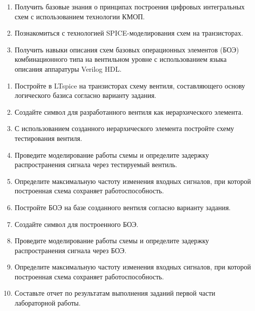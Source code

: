 


\tableofcontents


\newpage
\Chapter{\lab\ \labnumber}{\labtheme}{}
\begin{enumerate}
    \item Получить базовые знания о принципах построения цифровых интегральных схем с использованием технологии КМОП.
    \item Познакомиться с технологией SPICE-моделирования схем на транзисторах.
    \item Получить навыки описания схем базовых операционных элементов (БОЭ) комбинационного типа на вентильном уровне с использованием языка описания аппаратуры Verilog HDL.
\end{enumerate}


\begin{enumerate}
    \item Постройте в LTspice на транзисторах схему вентиля, составляющего основу логического базиса согласно варианту задания.
    \item Создайте символ для разработанного вентиля как иерархического элемента.
    \item С использованием созданного иерархического элемента постройте схему тестирования вентиля.
    \item Проведите моделирование работы схемы и определите задержку распространения сигнала через тестируемый вентиль.
    \item Определите максимальную частоту изменения входных сигналов, при которой построенная схема сохраняет работоспособность.
    \item Постройте БОЭ на базе созданного вентиля согласно варианту задания.
    \item Создайте символ для построенного БОЭ.
    \item Проведите моделирование работы схемы и определите задержку распространения сигнала через БОЭ.
    \item Определите максимальную частоту изменения входных сигналов, при которой
построенная схема сохраняет работоспособность.
    \item Составьте отчет по результатам выполнения заданий первой части лабораторной работы.
\end{enumerate}

